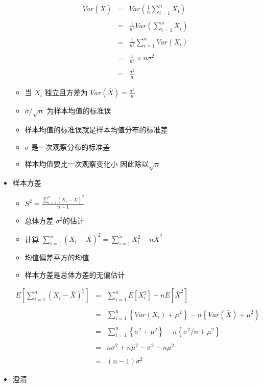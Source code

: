 \documentclass[]{book}
\providecommand{\tightlist}{%
  \setlength{\itemsep}{0pt}\setlength{\parskip}{0pt}}
\begin{document}
\begin{itemize}
  \begin{eqnarray*}
    Var(\bar X) & = & Var \left( \frac{1}{n}\sum_{i=1}^n X_i \right)\\ \\
    & = & \frac{1}{n^2} Var\left(\sum_{i=1}^n X_i \right)\\ \\
    & = & \frac{1}{n^2} \sum_{i=1}^n Var(X_i) \\ \\
    & = & \frac{1}{n^2} \times n\sigma^2 \\ \\
    & = & \frac{\sigma^2}{n}
  \end{eqnarray*}

  \begin{itemize}
  \tightlist
  \item
    当 \(X_i\) 独立且方差为 \(Var(\bar X) = \frac{\sigma^2}{n}\)
  \item
    \(\sigma/\sqrt{n}\) 为样本均值的标准误
  \item
    样本均值的标准误就是样本均值分布的标准差
  \item
    \(\sigma\) 是一次观察分布的标准差
  \item
    样本均值要比一次观察变化小 因此除以\(\sqrt{n}\)
  \end{itemize}
\item
  样本方差

  \begin{itemize}
  \tightlist
  \item
    \(S^2 = \frac{\sum_{i=1}^n (X_i - \bar X)^2}{n-1}\)
  \item
    总体方差 \(\sigma^2\)的估计
  \item
    计算 \(\sum_{i=1}^n (X_i - \bar X)^2 = \sum_{i=1}^n X_i^2 - n \bar X^2\)
  \item
    均值偏差平方的均值
  \item
    样本方差是总体方差的无偏估计
  \end{itemize}

  \begin{eqnarray*}
    E\left[\sum_{i=1}^n (X_i - \bar X)^2\right] & = & \sum_{i=1}^n E\left[X_i^2\right] - n E\left[\bar X^2\right] \\ \\
    & = & \sum_{i=1}^n \left\{Var(X_i) + \mu^2\right\} - n \left\{Var(\bar X) + \mu^2\right\} \\ \\
    & = & \sum_{i=1}^n \left\{\sigma^2 + \mu^2\right\} - n \left\{\sigma^2 / n + \mu^2\right\} \\ \\
    & = & n \sigma^2 + n \mu ^ 2 - \sigma^2 - n \mu^2 \\ \\
    & = & (n - 1) \sigma^2
  \end{eqnarray*}
\item
  澄清


\end{itemize}
\end{document}
